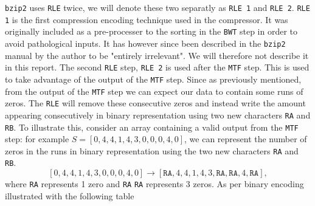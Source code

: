 \documentclass{article}
\begin{document}
\texttt{bzip2} uses \texttt{RLE} twice, we will denote these two separatly as \texttt{RLE 1} and \texttt{RLE 2}. 
\texttt{RLE 1} is the first compression encoding technique used in the compressor. It was originally included as a pre-processer to the sorting in the \texttt{BWT} step in order to avoid pathological inputs. It has however since been described in the \texttt{bzip2} manual by the author to be "entirely irrelevant". We will therefore not describe it in this report. %
The second \texttt{RLE} step, \texttt{RLE 2} is used after the \texttt{MTF} step. This is used to take advantage of the output of the \texttt{MTF} step. Since as previously mentioned, from the output of the \texttt{MTF} step we can expect our data to contain some runs of zeros. The \texttt{RLE} will remove these consecutive zeros and instead write the amount appearing consecutively in binary representation using two new characters \texttt{RA} and \texttt{RB}. To illustrate this, consider an array containing a valid output from the \texttt{MTF} step: for example \(S = [0, 4, 4, 1, 4, 3, 0, 0, 0, 4, 0]\), we can represent the number of zeros in the runs in binary representation using the two new characters \texttt{RA} and \texttt{RB}.
\[
    [0, 4, 4, 1, 4, 3, 0, 0, 0, 4, 0] \longrightarrow [\texttt{RA}, 4, 4, 1, 4, 3, \texttt{RA}, \texttt{RA}, 4, \texttt{RA}],
\]
where \texttt{RA} represents 1 zero and \texttt{RA} \texttt{RA} represents 3 zeros. As per binary encoding illustrated with the following table
\end{document}
